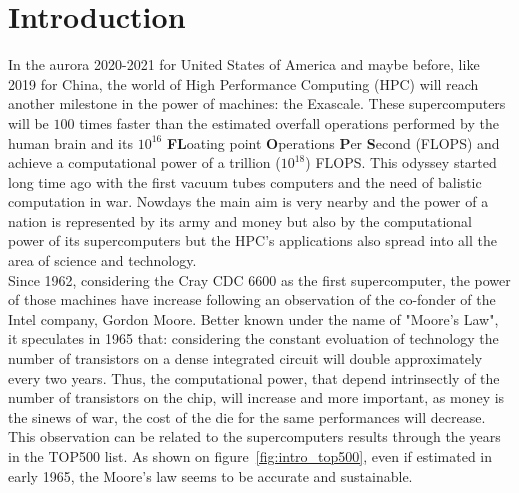 \chapter*{Introduction}

In the aurora 2020-2021 for United States of America and maybe before, like 2019 for China, the world of High Performance Computing (HPC) will reach another milestone in the power of machines: the Exascale. 
These supercomputers will be $100$ times faster than the estimated overfall operations performed by the human brain and its $10^{16}$ \textbf{FL}oating point \textbf{O}perations \textbf{P}er \textbf{S}econd (FLOPS) and achieve a computational power of a trillion ($10^{18}$) FLOPS.
This odyssey started long time ago with the first vacuum tubes computers and the need of balistic computation in war. 
Nowdays the main aim is very nearby and the power of a nation is represented by its army and money but also by the computational power of its supercomputers but the HPC's applications also spread into all the area of science and technology.\\

Since 1962, considering the Cray CDC 6600 as the first supercomputer, the power of those machines have increase following an observation of the co-fonder of the Intel company, Gordon Moore. 
Better known under the name of "Moore's Law", it speculates in 1965 that: considering the constant evoluation of technology the number of transistors on a dense integrated circuit will double approximately every two years. 
Thus, the computational power, that depend intrinsectly of the number of transistors on the chip, will increase and more important, as money is the sinews of war, the cost of the die for the same performances will decrease.  
This observation can be related to the supercomputers results through the years in the TOP500 list. 
As shown on figure~\ref{fig:intro_top500}, even if estimated in early 1965, the Moore's law seems to be accurate and sustainable. 

